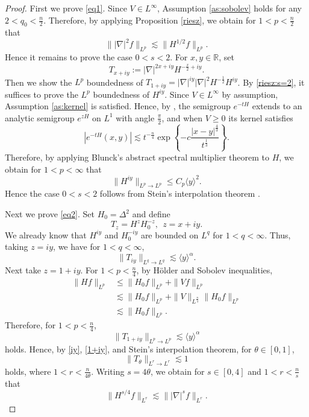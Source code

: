 \documentclass[11pt,a4paper]{article}
\numberwithin{equation}{section}
\begin{document}
\begin{proof}
First we prove \eqref{eq1}. Since $V\in L^{\infty}$, Assumption \ref{as:sobolev} holds for any $2 < q_{0} < \frac{n}{2}$. Therefore, by applying Proposition \ref{riesz}, we obtain for $1 < p < \frac{n}{2}$ that
\begin{equation}\label{riesz:s=2}
  \||\nabla |^{2}f\|_{L^{p}} \lesssim \|H^{1/2}f\|_{L^{p}}.
\end{equation}
Hence it remains to prove the case $0 < s < 2$. For $x,y \in \mathbb{R}$, set
\[ T_{x + iy} := |\nabla|^{2x + iy}H^{-\frac{x}{2} + iy}. \]
Then we show the $L^{p}$ boundedness of $T_{1 + iy} = |\nabla|^{iy}|\nabla|^{2}H^{-\frac{1}{2}}H^{iy}$. By \eqref{riesz:s=2}, it suffices to prove the $L^{p}$ boundedness of $H^{iy}$. Since $V \in L^{\infty}$ by assumption, Assumption \ref{as:kernel} is satisfied. Hence, by \cite{Deng-1}, the semigroup $e^{-tH}$ extends to an analytic semigroup $e^{zH}$ on $L^{1}$ with angle $\frac{\pi}{2}$, and when $V \geq 0$ its kernel satisfies
\begin{equation}
|e^{-tH}(x, y)| \lesssim t^{-\frac{n}{4}} \exp \left \{ -c\dfrac{|x - y|^{\frac{4}{3}}}{t^{\frac{1}{3}}} \right\}.
\end{equation}
Therefore, by applying Blunck's abstract spectral multiplier theorem \cite{Blunk} to $H$, we obtain for $1 < p < \infty$ that
\[ \|H^{iy}\|_{L^{p}\rightarrow L^{p}} \leq C_{p}\langle y \rangle^{2}. \]
Hence the case $0 < s < 2$ follows from Stein's interpolation theorem \cite{Stein}.

Next we prove \eqref{eq2}. Set $H_{0} = \Delta^{2}$ and define
\[ T_{z} = H^{z}H^{-z}_{0},\ \ z = x + iy. \]
We already know that $H^{iy}$ and $H^{-iy}_{0}$ are bounded on $L^{q}$ for $1 < q < \infty$. Thus, taking $z = iy$, we have for $1 < q < \infty$,
\begin{equation}\label{iy}
\|T_{iy}\|_{L^{q} \rightarrow L^{q}} \lesssim \langle y \rangle^{\alpha}.
\end{equation}
Next take $z = 1 + iy$. For $1 < p < \frac{n}{4}$, by H\"{o}lder and Sobolev inequalities,
\begin{align*}
\|Hf\|_{L^{p}} &\leq \|H_{0}f\|_{L^{p}} + \|Vf\|_{L^{p}} \\
&\lesssim \|H_{0}f\|_{L^{p}} + \|V\|_{L^{\frac{n}{4}}} \|H_{0}f\|_{L^{p}} \\
&\lesssim \|H_{0}f\|_{L^{p}}.
\end{align*}
Therefore, for $1 < p < \frac{n}{4}$,
\begin{equation}\label{1+iy}
\|T_{1 + iy}\|_{L^{p} \rightarrow L^{p}} \lesssim \langle y \rangle^{\alpha}
\end{equation}
holds. Hence, by \eqref{iy}, \eqref{1+iy}, and Stein's interpolation theorem, for $\theta \in [0, 1]$,
\[ \|T_{\theta}\|_{L^{r} \rightarrow L^{r}} \lesssim 1 \]
holds, where $1 < r < \frac{n}{4\theta}$. Writing $s = 4\theta$, we obtain for $s \in [0, 4]$ and $1 < r < \frac{n}{s}$ that
\[ \|H^{s/4}f\|_{L^{r}} \lesssim \||\nabla |^{s}f\|_{L^{r}}. \]
\end{proof}
\end{document}
